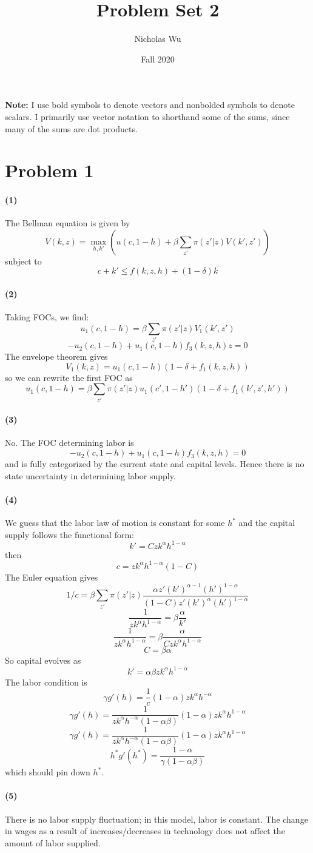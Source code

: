 \documentclass[10pt,letter]{article}
\newcommand{\problem}[1]{\section*{Problem #1}}
\newcommand{\problempart}[1]{\paragraph{#1}}
\begin{document}


\title{Problem Set 2}

\author{Nicholas Wu}

\date{Fall 2020}

\maketitle
\textbf{Note:} I use bold symbols to denote vectors and nonbolded symbols to denote scalars. I primarily use vector notation to shorthand some of the sums, since many of the sums are dot products.

\problem{1}

\problempart{(1)} The Bellman equation is given by
\[ V(k, z) = \max_{h, k'} \left(u(c, 1-h) + \beta \sum_{z'} \pi(z' | z) V(k', z')\right) \]
subject to
\[ c + k' \le f(k, z, h) + (1-\delta)k \]
\problempart{(2)}
Taking FOCs, we find:
\[ u_1(c, 1-h) = \beta \sum_{z'} \pi(z' | z) V_1(k', z') \]
\[ -u_2(c, 1-h) + u_1(c, 1-h) f_3(k, z, h) z = 0 \]
The envelope theorem gives
\[ V_1(k, z) = u_1(c, 1-h) \left(1 - \delta + f_1(k, z, h)\right) \]
so we can rewrite the first FOC as
\[ u_1(c, 1-h) = \beta \sum_{z'} \pi(z' | z) u_1(c', 1-h') \left(1 - \delta + f_1(k', z', h')\right) \]
\problempart{(3)}
No. The FOC determining labor is
\[ -u_2(c, 1-h) + u_1(c, 1-h) f_3(k, z, h) = 0 \]
and is fully categorized by the current state and capital levels. Hence there is no state uncertainty in determining labor supply.
\problempart{(4)}
We guess that the labor law of motion is constant for some $h^*$ and the capital supply follows the functional form:
\[ k' = Czk^\alpha h^{1-\alpha} \]
then
\[ c = zk^\alpha h^{1-\alpha}(1-C) \]
The Euler equation gives
\[ 1/c = \beta \sum_{z'} \pi(z' | z)  \frac{ \alpha z' (k')^{\alpha - 1}(h')^{1-\alpha}}{(1-C)z' (k')^\alpha (h')^{1-\alpha}} \]
\[ \frac{1}{zk^\alpha h^{1-\alpha}} = \beta  \frac{ \alpha }{k'} \]
\[ \frac{1}{zk^\alpha h^{1-\alpha}} = \beta  \frac{ \alpha }{Czk^\alpha h^{1-\alpha}} \]
\[C  = \beta\alpha \]
So capital evolves as
\[ k' = \alpha\beta zk^\alpha h^{1-\alpha} \]
The labor condition is
\[ \gamma g'(h) = \frac{1}{c} (1-\alpha)zk^\alpha h^{-\alpha}  \]
\[ \gamma g'(h) = \frac{1}{zk^\alpha h^{-\alpha}(1-\alpha\beta)} (1-\alpha)zk^\alpha h^{1-\alpha}  \]
\[ \gamma g'(h) = \frac{1}{zk^\alpha h^{-\alpha}(1-\alpha\beta)} (1-\alpha)zk^\alpha h^{1-\alpha}  \]
\[ h^* g'(h^*) = \frac{1-\alpha}{\gamma(1-\alpha\beta)} \]
which should pin down $h^*$.
\problempart{(5)}
There is no labor supply fluctuation; in this model, labor is constant. The change in wages as a result of increases/decreases in technology does not affect the amount of labor supplied.
\pagebreak
\end{document}
